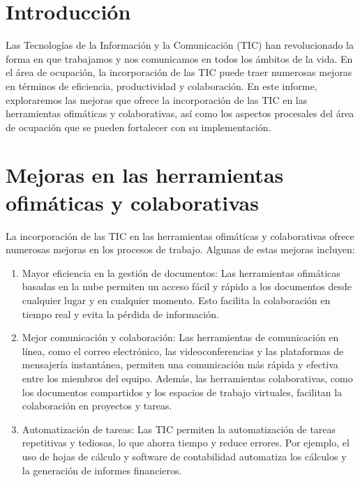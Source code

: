 \documentclass{article}
\theoremstyle{mytheoremstyle}
\theoremstyle{mytheoremstyle}
\theoremstyle{myproblemstyle}
\begin{document}
    \newpage


\section{Introducción}

Las Tecnologías de la Información y la Comunicación (TIC) han revolucionado la forma en que trabajamos y nos comunicamos en todos los ámbitos de la vida. En el área de ocupación, la incorporación de las TIC puede traer numerosas mejoras en términos de eficiencia, productividad y colaboración. En este informe, exploraremos las mejoras que ofrece la incorporación de las TIC en las herramientas ofimáticas y colaborativas, así como los aspectos procesales del área de ocupación que se pueden fortalecer con su implementación.

\section{Mejoras en las herramientas ofimáticas y colaborativas}

La incorporación de las TIC en las herramientas ofimáticas y colaborativas ofrece numerosas mejoras en los procesos de trabajo. Algunas de estas mejoras incluyen:

\begin{enumerate}
  \item Mayor eficiencia en la gestión de documentos: Las herramientas ofimáticas basadas en la nube permiten un acceso fácil y rápido a los documentos desde cualquier lugar y en cualquier momento. Esto facilita la colaboración en tiempo real y evita la pérdida de información.
  
  \item Mejor comunicación y colaboración: Las herramientas de comunicación en línea, como el correo electrónico, las videoconferencias y las plataformas de mensajería instantánea, permiten una comunicación más rápida y efectiva entre los miembros del equipo. Además, las herramientas colaborativas, como los documentos compartidos y los espacios de trabajo virtuales, facilitan la colaboración en proyectos y tareas.
  
  \item Automatización de tareas: Las TIC permiten la automatización de tareas repetitivas y tediosas, lo que ahorra tiempo y reduce errores. Por ejemplo, el uso de hojas de cálculo y software de contabilidad automatiza los cálculos y la generación de informes financieros.
\end{enumerate}
\end{document}

